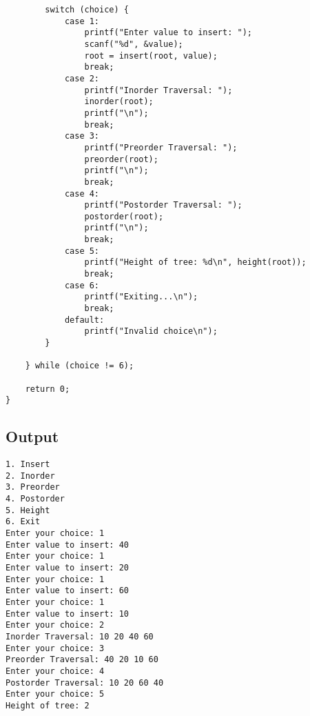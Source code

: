 \documentclass[12pt,a4paper]{article}
\begin{document}
\begin{lstlisting}
        switch (choice) {
            case 1:
                printf("Enter value to insert: ");
                scanf("%d", &value);
                root = insert(root, value);
                break;
            case 2:
                printf("Inorder Traversal: ");
                inorder(root);
                printf("\n");
                break;
            case 3:
                printf("Preorder Traversal: ");
                preorder(root);
                printf("\n");
                break;
            case 4:
                printf("Postorder Traversal: ");
                postorder(root);
                printf("\n");
                break;
            case 5:
                printf("Height of tree: %d\n", height(root));
                break;
            case 6:
                printf("Exiting...\n");
                break;
            default:
                printf("Invalid choice\n");
        }

    } while (choice != 6);

    return 0;
}
\end{lstlisting}

\subsection*{Output}
\begin{tcolorbox}[terminalstyle, title=Sample Output]
\texttt{1. Insert\\2. Inorder\\3. Preorder\\4. Postorder\\5. Height\\6. Exit\\
Enter your choice: 1\\
Enter value to insert: 40\\
Enter your choice: 1\\
Enter value to insert: 20\\
Enter your choice: 1\\
Enter value to insert: 60\\
Enter your choice: 1\\
Enter value to insert: 10\\
Enter your choice: 2\\
Inorder Traversal: 10 20 40 60\\
Enter your choice: 3\\
Preorder Traversal: 40 20 10 60\\
Enter your choice: 4\\
Postorder Traversal: 10 20 60 40\\
Enter your choice: 5\\
Height of tree: 2}
\end{tcolorbox}
\end{document}
